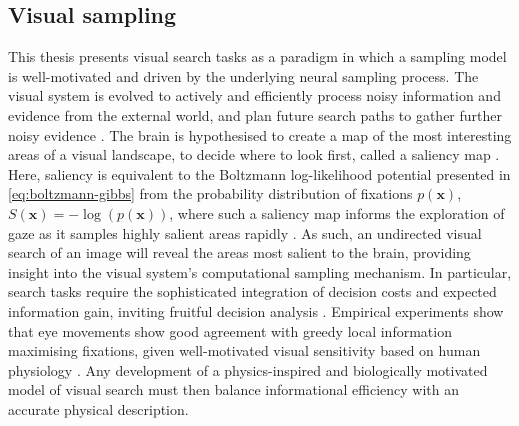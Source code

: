 \subsection{Visual sampling}\label{subsec:visual_sampling}
This thesis presents visual search tasks as a paradigm in which a sampling model is well-motivated and driven by the underlying neural sampling process. The visual system is evolved to actively and efficiently process noisy information and evidence from the external world, and plan future search paths to gather further noisy evidence \cite{Renninger2005-ee, renninger_where_2007, najemnik_optimal_2005, bujia_modeling_2022}. The brain is hypothesised to create a map of the most interesting areas of a visual landscape, to decide where to look first, called a saliency map \cite{ZHAOPING2026103211}. Here, saliency is equivalent to the Boltzmann log-likelihood potential presented in \cref{eq:boltzmann-gibbs} from the probability distribution of fixations $p(\textbf{x})$, $S(\textbf{x}) = -\log(p(\textbf{x}))$, where such a saliency map informs the exploration of gaze as it samples highly salient areas rapidly \cite{ZHAOPING2026103211, Bruce_2009_Saliency}. As such, an undirected visual search of an image will reveal the areas most salient to the brain, providing insight into the visual system's computational sampling mechanism. In particular, search tasks require the sophisticated integration of decision costs and expected information gain, inviting fruitful decision analysis \cite{Wedel_2023}. Empirical experiments show that eye movements show good agreement with greedy local information maximising fixations, given well-motivated visual sensitivity based on human physiology \cite{Radulescu_2026, najemnik_optimal_2005, renninger_where_2007}. Any development of a physics-inspired and biologically motivated model of visual search must then balance informational efficiency with an accurate physical description.

